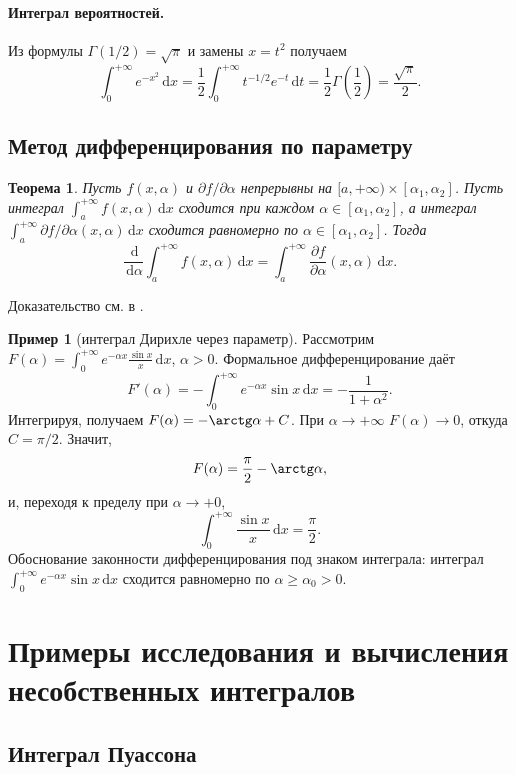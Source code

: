 \documentclass[12pt,a4paper]{article}
\newtheorem{theorem}{Теорема}[section]
\theoremstyle{definition}
\newtheorem{example}{Пример}[section]
\newcommand{\dd}{\,\mathrm{d}}
\begin{document}
\paragraph{Интеграл вероятностей.} Из формулы $\Gamma(1/2)=\sqrt{\pi}$ и замены $x=t^2$ получаем
\[
\int_0^{+\infty}e^{-x^2}\dd x = \frac12\int_0^{+\infty}t^{-1/2}e^{-t}\dd t=\frac12\Gamma\!\left(\frac12\right)=\frac{\sqrt{\pi}}{2}.
\]

\subsection{Метод дифференцирования по параметру}

\begin{theorem}\label{th:param}
Пусть $f(x,\alpha)$ и $\partial f/\partial\alpha$ непрерывны на $[a,+\infty)\times[\alpha_1,\alpha_2]$. Пусть интеграл $\int_a^{+\infty}f(x,\alpha)\dd x$ сходится при каждом $\alpha\in[\alpha_1,\alpha_2]$, а интеграл $\int_a^{+\infty}\partial f/\partial\alpha(x,\alpha)\dd x$ сходится равномерно по $\alpha\in[\alpha_1,\alpha_2]$. Тогда
\[
\frac{\dd}{\dd\alpha}\int_a^{+\infty}f(x,\alpha)\dd x = \int_a^{+\infty}\frac{\partial f}{\partial\alpha}(x,\alpha)\dd x.
\]
\end{theorem}

Доказательство см. в \cite[гл.~XVII,~\S2]{Zorich2}.

\begin{example}[интеграл Дирихле через параметр]\label{ex:param}
Рассмотрим $F(\alpha)=\displaystyle\int_0^{+\infty}e^{-\alpha x}\frac{\sin x}{x}\dd x$, $\alpha>0$. Формальное дифференцирование даёт
\[
F'(\alpha)=-\int_0^{+\infty}e^{-\alpha x}\sin x\dd x = -\frac{1}{1+\alpha^2}.
\]
Интегрируя, получаем $F(\alpha)=-\arctg\alpha+C$. При $\alpha\to+\infty$ $F(\alpha)\to0$, откуда $C=\pi/2$. Значит,
\[
F(\alpha)=\frac{\pi}{2}-\arctg\alpha,
\]
и, переходя к пределу при $\alpha\to+0$,
\[
\int_0^{+\infty}\frac{\sin x}{x}\dd x = \frac{\pi}{2}.
\]
Обоснование законности дифференцирования под знаком интеграла: интеграл $\int_0^{+\infty}e^{-\alpha x}\sin x\dd x$ сходится равномерно по $\alpha\ge\alpha_0>0$.
\end{example}

\section{Примеры исследования и вычисления несобственных интегралов}

\subsection{Интеграл Пуассона}
\end{document}
